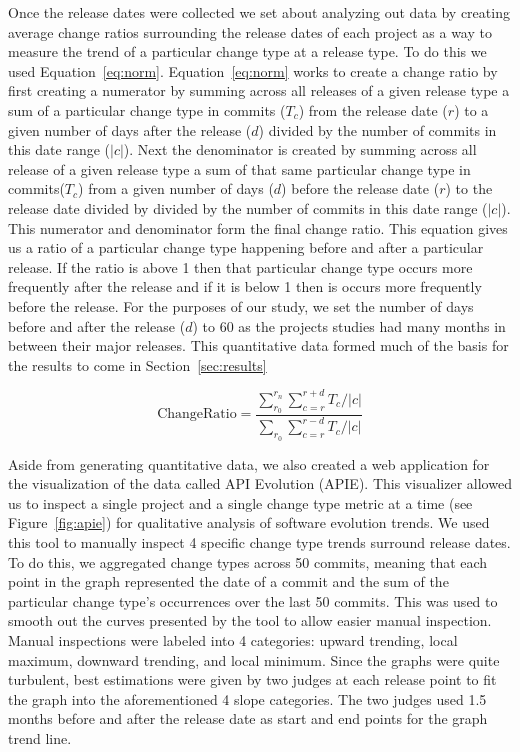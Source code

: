 \documentclass[conference]{IEEEtran}
\begin{document}
Once the release dates were collected we set about analyzing out data by creating average change ratios surrounding the release dates of each 
project as a way to measure the trend of a particular change type at a release type. 
To do this we used Equation~\ref{eq:norm}. Equation~\ref{eq:norm} works to create a change ratio by first creating a numerator by summing across all releases of
a given release type a sum of a particular change type in commits ($T_c$)
from the release date ($r$) to a given number of days after the release ($d$) divided by the number of commits in this date range ($|c|$). Next the denominator
is created by summing across all release of a given release type
a sum of that same particular change type in commits($T_c$) from a given number of days ($d$) before the release date ($r$) to
the release date divided by divided by the number of commits in this date range ($|c|$). This numerator and denominator form the final change ratio.
This equation gives us a ratio of a particular change type happening before and after a particular release. If the ratio is above 1 then that particular change
type occurs more frequently after the release and if it is below 1 then is occurs more frequently before the release. For the purposes of our study, we set the
number of days before and after the release ($d$) to 60 as the projects studies had many months in between their major releases. This quantitative data
formed much of the basis for the results to come in Section~\ref{sec:results}

\begin{equation}
\text{ChangeRatio} = \frac{ \sum_{r_0}^{r_n}\sum_{c=r}^{r+d} T_c / |c|} { \sum_{r_0}\sum_{c=r}^{r-d} T_c / |c|}
\label{eq:norm}
\end{equation}

Aside from generating quantitative data, we also created a web application for the visualization of the data called API Evolution (APIE). This visualizer allowed
us to inspect a single project and a single change type metric at a time (see Figure~\ref{fig:apie}) for qualitative analysis of software evolution trends. We
used this tool to manually inspect 4 specific change type trends surround release dates. To do this, we aggregated change types across 50 commits, meaning that
each point in the graph represented the date of a commit and the sum of the particular change type's occurrences over the last 50 commits. This was used to smooth
out the curves presented by the tool to allow easier manual inspection. Manual inspections were labeled into 4 categories: upward trending, local maximum, downward
trending, and local minimum. Since the graphs were quite turbulent, best estimations were given by two judges at each release point to fit the graph into the aforementioned
4 slope categories. The two judges used 1.5 months before and after the release date as start and end points for the graph trend line.
\end{document}
